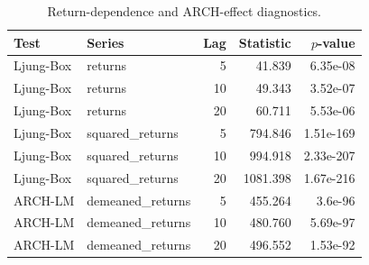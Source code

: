 \begin{table}[!t]
\centering
\caption{Return-dependence and ARCH-effect diagnostics.}
\label{tab:volatility-clustering-diagnostics}
\scriptsize
\begin{tabular}{@{}llrrr@{}}
\toprule
Test & Series & Lag & Statistic & \(p\)-value \\
\midrule
Ljung-Box & returns & 5 & 41.839 & 6.35e-08 \\
Ljung-Box & returns & 10 & 49.343 & 3.52e-07 \\
Ljung-Box & returns & 20 & 60.711 & 5.53e-06 \\
Ljung-Box & squared\_returns & 5 & 794.846 & 1.51e-169 \\
Ljung-Box & squared\_returns & 10 & 994.918 & 2.33e-207 \\
Ljung-Box & squared\_returns & 20 & 1081.398 & 1.67e-216 \\
ARCH-LM & demeaned\_returns & 5 & 455.264 & 3.6e-96 \\
ARCH-LM & demeaned\_returns & 10 & 480.760 & 5.69e-97 \\
ARCH-LM & demeaned\_returns & 20 & 496.552 & 1.53e-92 \\
\bottomrule
\end{tabular}
\end{table}

